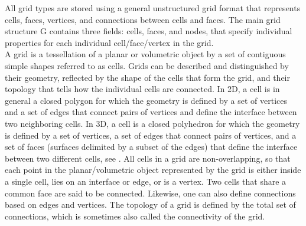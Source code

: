\documentclass[a4paper,10pt]{report}
\begin{document}
All grid types are stored using a general unstructured grid format that represents cells, faces, vertices, and connections between cells and faces. The main
grid structure G contains three fields: cells, faces, and nodes, that specify
individual properties for each individual cell/face/vertex in the grid.\\


A grid is a tessellation of a planar or volumetric object by a set of contiguous
simple shapes referred to as cells. Grids can be described and distinguished
by their geometry, reflected by the shape of the cells that form the grid, and
their topology that tells how the individual cells are connected. In 2D, a cell is
in general a closed polygon for which the geometry is defined by a set of vertices
and a set of edges that connect pairs of vertices and define the interface
between two neighboring cells. In 3D, a cell is a closed polyhedron for which
the geometry is defined by a set of vertices, a set of edges that connect pairs of
vertices, and a set of faces (surfaces delimited by a subset of the edges) that
define the interface between two different cells, see  . All cells in a grid are non-overlapping, so that each point in the
planar/volumetric object represented by the grid is either inside a single cell,
lies on an interface or edge, or is a vertex. Two cells that share a common
face are said to be connected. Likewise, one can also define connections based
on edges and vertices. The topology of a grid is defined by the total set of
connections, which is sometimes also called the connectivity of the grid.
\end{document}
